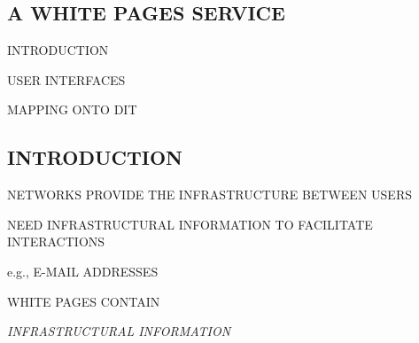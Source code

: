 \begin{bwslide}
\part	{A WHITE PAGES SERVICE}\bf

\begin{nrtc}
\item	INTRODUCTION

\item	USER INTERFACES

\item	MAPPING ONTO DIT
\end{nrtc}
\end{bwslide}


\begin{bwslide}
\part*	{INTRODUCTION}\bf

\begin{nrtc}
\item	NETWORKS PROVIDE THE INFRASTRUCTURE BETWEEN USERS

\item	NEED INFRASTRUCTURAL INFORMATION TO FACILITATE INTERACTIONS
    \begin{nrtc}
    \item	e.g., E-MAIL ADDRESSES
    \end{nrtc}

\item	WHITE PAGES CONTAIN 
    \begin{nrtc}
    \item	\emph{INFRASTRUCTURAL INFORMATION}
    \end{nrtc}
\end{nrtc}
\end{bwslide}


